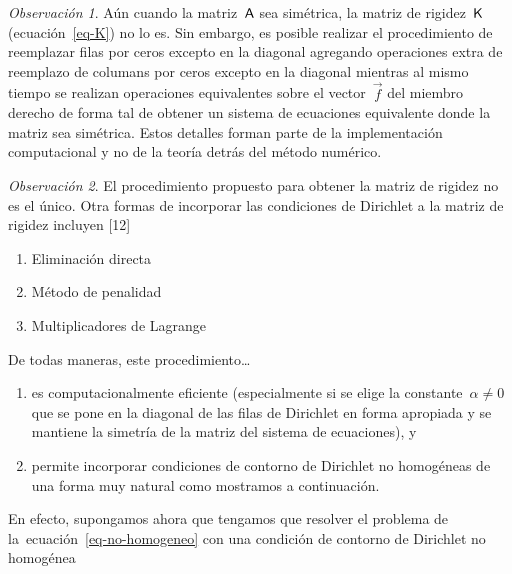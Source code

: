 \documentclass[
  12pt,
  a4paper,
  table]{scrbook}
\providecommand{\tightlist}{%
  \setlength{\itemsep}{0pt}\setlength{\parskip}{0pt}}\usepackage{longtable,booktabs,array}
\theoremstyle{plain}
\theoremstyle{definition}
\theoremstyle{plain}
\theoremstyle{plain}
\theoremstyle{remark}
\newtheorem*{remark}{Observación}
\begin{document}
\begin{remark}

Aún cuando la matriz~\(\mathsf{A}\) sea simétrica, la matriz de
rigidez~\(\mathsf{K}\) (ecuación~\ref{eq-K}) no lo es. Sin embargo, es
posible realizar el procedimiento de reemplazar filas por ceros excepto
en la diagonal agregando operaciones extra de reemplazo de columans por
ceros excepto en la diagonal mientras al mismo tiempo se realizan
operaciones equivalentes sobre el vector~\(\vec{f}\) del miembro derecho
de forma tal de obtener un sistema de ecuaciones equivalente donde la
matriz sea simétrica. Estos detalles forman parte de la implementación
computacional y no de la teoría detrás del método numérico.

\end{remark}

\begin{remark}

El procedimiento propuesto para obtener la matriz de rigidez no es el
único. Otra formas de incorporar las condiciones de Dirichlet a la
matriz de rigidez incluyen {[}12{]}

\begin{enumerate}
\def\labelenumi{\arabic{enumi}.}
\tightlist
\item
  Eliminación directa
\item
  Método de penalidad
\item
  Multiplicadores de Lagrange
\end{enumerate}

De todas maneras, este procedimiento\ldots{}

\begin{enumerate}
\def\labelenumi{\alph{enumi}.}
\tightlist
\item
  es computacionalmente eficiente (especialmente si se elige la
  constante~\(\alpha \neq 0\) que se pone en la diagonal de las filas de
  Dirichlet en forma apropiada y se mantiene la simetría de la matriz
  del sistema de ecuaciones), y
\item
  permite incorporar condiciones de contorno de Dirichlet no homogéneas
  de una forma muy natural como mostramos a continuación.
\end{enumerate}

\end{remark}

En efecto, supongamos ahora que tengamos que resolver el problema de
la~ecuación~\ref{eq-no-homogeneo} con una condición de contorno de
Dirichlet no homogénea
\end{document}
